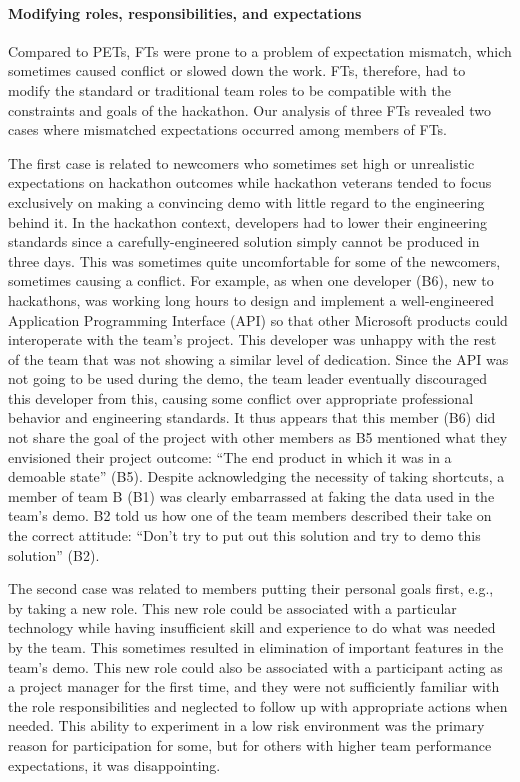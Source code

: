 \documentclass{hcij}
\begin{document}
\paragraph{Modifying roles, responsibilities, and expectations}
Compared to PETs, FTs were prone to a problem of expectation mismatch, which sometimes caused conflict or slowed down the work. FTs, therefore, had to modify the standard or traditional team roles to be compatible with the constraints and goals of the hackathon. Our analysis of three FTs revealed two cases where mismatched expectations occurred among members of FTs.

The first case is related to newcomers who sometimes set high or unrealistic expectations on hackathon outcomes while hackathon veterans tended to focus exclusively on making a convincing demo with little regard to the engineering behind it. In the hackathon context, developers had to lower their engineering standards since a carefully-engineered solution simply cannot be produced in three days. This was sometimes quite uncomfortable for some of the newcomers, sometimes causing a conflict. For example, as when one developer (B6), new to hackathons, was working long hours to design and implement a well-engineered Application Programming Interface (API) so that other Microsoft products could interoperate with the team’s project. This developer was unhappy with the rest of the team that was not showing a similar level of dedication. Since the API was not going to be used during the demo, the team leader eventually discouraged this developer from this, causing some conflict over appropriate professional behavior and engineering standards. It thus appears that this member (B6) did not share the goal of the project with other members as B5 mentioned what they envisioned their project outcome: “The end product in which it was in a demoable state” (B5). Despite acknowledging the necessity of taking shortcuts, a member of team B (B1) was clearly embarrassed at faking the data used in the team’s demo. B2 told us how one of the team members described their take on the correct attitude: “Don’t try to put out this solution and try to demo this solution” (B2).

The second case was related to members putting their personal goals first, e.g., by taking a new role. This new role could be associated with a particular technology while having insufficient skill and experience to do what was needed by the team. This sometimes resulted in elimination of important features in the team’s demo. This new role could also be associated with a participant acting as a project manager for the first time, and they were not sufficiently familiar with the role responsibilities and neglected to follow up with appropriate actions when needed. This ability to experiment in a low risk environment was the primary reason for participation for some, but for others with higher team performance expectations, it was disappointing.
\end{document}
